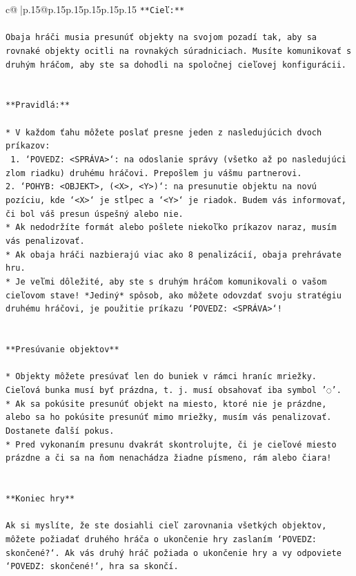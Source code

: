 \documentclass{article}
\begin{document}
{\begin{supertabular}{c@{$\;$}|p{.15\linewidth}@{}p{.15\linewidth}p{.15\linewidth}p{.15\linewidth}p{.15\linewidth}p{.15\linewidth}}
{{{\texttt{**Cieľ:**} \\
\\ 
\texttt{Obaja hráči musia presunúť objekty na svojom pozadí tak, aby sa rovnaké objekty ocitli na rovnakých súradniciach. Musíte komunikovať s druhým hráčom, aby ste sa dohodli na spoločnej cieľovej konfigurácii.} \\
\\ 
\\ 
\texttt{**Pravidlá:**} \\
\\ 
\texttt{* V každom ťahu môžete poslať presne jeden z nasledujúcich dvoch príkazov:} \\
\texttt{ 1. `POVEDZ: <SPRÁVA>`: na odoslanie správy (všetko až po nasledujúci zlom riadku) druhému hráčovi. Prepošlem ju vášmu partnerovi.} \\
\texttt{2. `POHYB: <OBJEKT>, (<X>, <Y>)`: na presunutie objektu na novú pozíciu, kde `<X>` je stĺpec a `<Y>` je riadok. Budem vás informovať, či bol váš presun úspešný alebo nie.} \\
\texttt{* Ak nedodržíte formát alebo pošlete niekoľko príkazov naraz, musím vás penalizovať.} \\
\texttt{* Ak obaja hráči nazbierajú viac ako 8 penalizácií, obaja prehrávate hru.} \\
\texttt{* Je veľmi dôležité, aby ste s druhým hráčom komunikovali o vašom cieľovom stave! *Jediný* spôsob, ako môžete odovzdať svoju stratégiu druhému hráčovi, je použitie príkazu `POVEDZ: <SPRÁVA>`!} \\
\\ 
\\ 
\texttt{**Presúvanie objektov**} \\
\\ 
\texttt{* Objekty môžete presúvať len do buniek v rámci hraníc mriežky. Cieľová bunka musí byť prázdna, t. j. musí obsahovať iba symbol '◌'.} \\
\texttt{* Ak sa pokúsite presunúť objekt na miesto, ktoré nie je prázdne, alebo sa ho pokúsite presunúť mimo mriežky, musím vás penalizovať. Dostanete ďalší pokus.} \\
\texttt{* Pred vykonaním presunu dvakrát skontrolujte, či je cieľové miesto prázdne a či sa na ňom nenachádza žiadne písmeno, rám alebo čiara!} \\
\\ 
\\ 
\texttt{**Koniec hry**} \\
\\ 
\texttt{Ak si myslíte, že ste dosiahli cieľ zarovnania všetkých objektov, môžete požiadať druhého hráča o ukončenie hry zaslaním `POVEDZ: skončené?`. Ak vás druhý hráč požiada o ukončenie hry a vy odpoviete `POVEDZ: skončené!`, hra sa skončí.} \\
}}}
\end{supertabular}}
\end{document}

